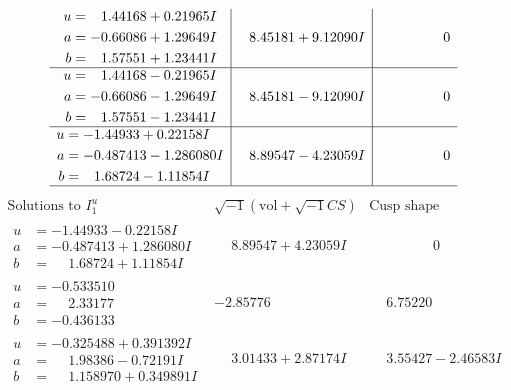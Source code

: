 \documentclass[1p]{elsarticle_modified}
\theoremstyle{definition}
\newcommand{\I}{\sqrt{-1}}
\begin{document}
$$\begin{array}{c|c|c}
\begin{aligned}
u &= \phantom{-}1.44168 + 0.21965 I \\
a &= -0.66086 + 1.29649 I \\
b &= \phantom{-}1.57551 + 1.23441 I\end{aligned}
 & \phantom{-}8.45181 + 9.12090 I & \phantom{-0.000000 } 0 \\ \hline\begin{aligned}
u &= \phantom{-}1.44168 - 0.21965 I \\
a &= -0.66086 - 1.29649 I \\
b &= \phantom{-}1.57551 - 1.23441 I\end{aligned}
 & \phantom{-}8.45181 - 9.12090 I & \phantom{-0.000000 } 0 \\ \hline\begin{aligned}
u &= -1.44933 + 0.22158 I \\
a &= -0.487413 - 1.286080 I \\
b &= \phantom{-}1.68724 - 1.11854 I\end{aligned}
 & \phantom{-}8.89547 - 4.23059 I & \phantom{-0.000000 } 0\\
 \hline 
 \end{array}$$\newpage$$\begin{array}{c|c|c}  
\text{Solutions to }I^u_{1}& \I (\text{vol} + \sqrt{-1}CS) & \text{Cusp shape}\\
 \hline 
\begin{aligned}
u &= -1.44933 - 0.22158 I \\
a &= -0.487413 + 1.286080 I \\
b &= \phantom{-}1.68724 + 1.11854 I\end{aligned}
 & \phantom{-}8.89547 + 4.23059 I & \phantom{-0.000000 } 0 \\ \hline\begin{aligned}
u &= -0.533510\phantom{ +0.000000I} \\
a &= \phantom{-}2.33177\phantom{ +0.000000I} \\
b &= -0.436133\phantom{ +0.000000I}\end{aligned}
 & -2.85776\phantom{ +0.000000I} & \phantom{-}6.75220\phantom{ +0.000000I} \\ \hline\begin{aligned}
u &= -0.325488 + 0.391392 I \\
a &= \phantom{-}1.98386 - 0.72191 I \\
b &= \phantom{-}1.158970 + 0.349891 I\end{aligned}
 & \phantom{-}3.01433 + 2.87174 I & \phantom{-}3.55427 - 2.46583 I \\ \hline\begin{aligned}

\end{aligned}
\end{array}$$
\end{document}
